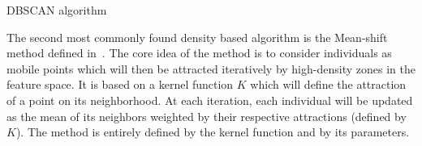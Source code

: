 \begin{algorithm}
    \caption{DBSCAN algorithm}
\label{alg:dbscan}

    \end{algorithm}


    The second most commonly found density based algorithm is the Mean-shift method defined in~\cite{cheng1995mean}. The core idea of the method is to consider individuals as mobile points which will then be attracted iteratively by high-density zones in the feature space. It is based on a kernel function $K$ which will define the attraction of a point on its neighborhood. At each iteration, each individual will be updated as the mean of its neighbors weighted by their respective attractions (defined by $K$). The method is entirely defined by the kernel function and by its parameters.

